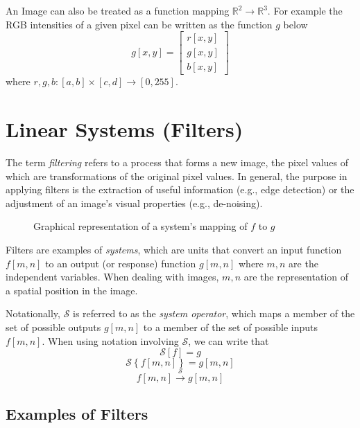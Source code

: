 \documentclass{article}
\begin{document}
An Image can also be treated as a function mapping $\mathbb{R}^{2} \to \mathbb{R}^3$. For example the RGB intensities of a given pixel can be written as the function $g$ below
\[
	g[x, y] = \begin{bmatrix} r[x, y] \\ g[x, y] \\ b[x, y] \end{bmatrix} \tag{Color Pixel Intensity}
\]
where $r, g, b: [a, b] \times [c, d] \to [0, 255]$.

\section{Linear Systems (Filters)}

The term \emph{filtering} refers to a process that forms a new image, the pixel values of which are transformations of the original pixel values. In general, the purpose in applying filters is the extraction of useful information (e.g., edge detection) or the adjustment of an image's visual properties (e.g., de-noising).

\begin{figure}
\begin{center}
\end{center}
\caption{Graphical representation of a system's mapping of $f$ to $g$}
\end{figure}

Filters are examples of \emph{systems}, which are units that convert an input function $f[m, n]$ to an output (or response) function $g[m, n]$ where $m, n$ are the independent variables. When dealing with images, $m, n$ are the representation of a spatial position in the image.

Notationally, $\mathcal{S}$ is referred to as the \emph{system operator}, which maps a member of the set of possible outputs $g[m, n]$ to a member of the set of possible inputs $f[m, n]$. When using notation involving $\mathcal{S}$, we can write that
\[
\mathcal{S}[f] = g
\]
\[
	\mathcal{S}\left\{f[m, n]\right\} = g[m, n]
\]
\[
	f[m, n] \xrightarrow{\mathcal{S}} g[m, n]
\]

\subsection{Examples of Filters}
\end{document}
